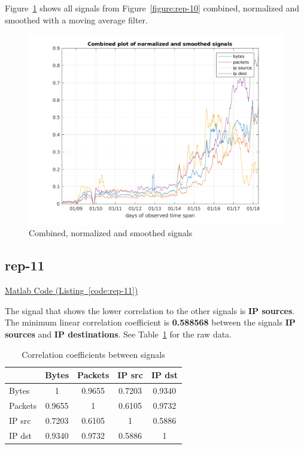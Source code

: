 \documentclass{article}
\newcommand{\codelink}[1]{%
    \hyperref[#1]{\faArrowCircleRight\enskip Matlab Code (Listing~\ref{#1})}%
}
\begin{document}
Figure~\ref{figure:rep-10-optional} shows all signals from Figure~\ref{figure:rep-10} combined, normalized
and smoothed with a moving average filter.

\begin{figure}[H]
    \centering
    \includegraphics[width=\textwidth]{../exercise-3/plots/rep_10_optional}
    \caption{\label{figure:rep-10-optional} Combined, normalized and smoothed signals}
\end{figure}

\subsection{rep-11}

\codelink{code:rep-11}

The signal that shows the lower correlation to the other signals is \textbf{IP sources}. The minimum
linear correlation coefficient is \textbf{0.588568} between the signals \textbf{IP sources} and
\textbf{IP destinations}. See Table~\ref{table:rep-11} for the raw data.

\begin{table}[h]
    \centering
    \begin{tabular}{l|c|c|c|c}
                & Bytes  & Packets& IP src    & IP dst    \\
        \hline
        Bytes   & 1      & 0.9655 & 0.7203 & 0.9340 \\
        Packets & 0.9655 & 1      & 0.6105 & 0.9732 \\
        IP src     & 0.7203 & 0.6105 & 1      & 0.5886 \\
        IP dst     & 0.9340 & 0.9732 & 0.5886 & 1      \\
    \end{tabular}
    \caption{\label{table:rep-11} Correlation coefficients between signals}
\end{table}
\end{document}
